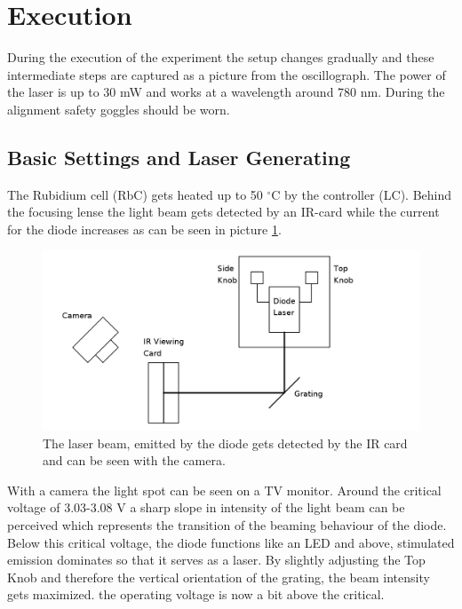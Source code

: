 \section{Execution}
During the execution of the experiment the setup changes gradually and these intermediate steps are captured as a picture from the oscillograph. The power
of the laser is up to 30 mW and works at a wavelength around 780 nm. During the alignment safety goggles should be worn.
\subsection{Basic Settings and Laser Generating}
The Rubidium cell (RbC) gets heated up to 50 $^\circ$C by the controller (LC). Behind the focusing lense the light beam gets detected by an IR-card while
the current for the diode increases as can be seen in picture \ref{pic_setup1}. 
\begin{figure}[t]
 \includegraphics[width=\textwidth]{../pics/setup1.png}
 \caption{The laser beam, emitted by the diode gets detected by the IR card and can be seen with the camera.}
 \label{pic_setup1}
\end{figure}
With a camera the light spot can be seen on a TV monitor. Around the critical
voltage of 3.03-3.08 V a sharp slope in intensity of the light beam can be perceived which represents the transition of the beaming behaviour of the diode.
Below this critical voltage, the diode functions like an LED and above, stimulated emission dominates so that it serves as a laser. By slightly adjusting
the Top Knob and therefore the vertical orientation of the grating, the beam intensity gets maximized. the operating voltage is now a bit above the critical.

